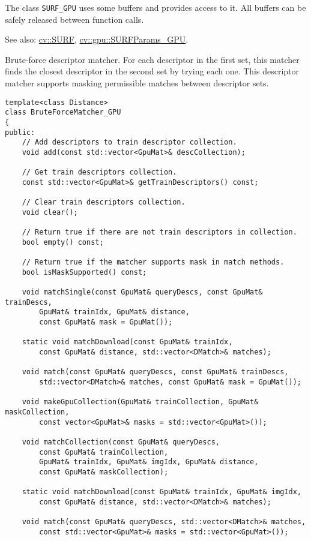 The class \texttt{SURF\_GPU} uses some buffers and provides access to it. All buffers can be safely released between function calls. 

See also: \hyperref[cv.class.SURF]{cv::SURF}, \hyperref[class.gpu.SURFParams]{cv::gpu::SURFParams\_GPU}.


Brute-force descriptor matcher. For each descriptor in the first set, this matcher finds the closest descriptor in the second set by trying each one. This descriptor matcher supports masking permissible matches between descriptor sets.

\begin{lstlisting}
template<class Distance>
class BruteForceMatcher_GPU
{
public:
    // Add descriptors to train descriptor collection.
    void add(const std::vector<GpuMat>& descCollection);

    // Get train descriptors collection.
    const std::vector<GpuMat>& getTrainDescriptors() const;

    // Clear train descriptors collection.
    void clear();

    // Return true if there are not train descriptors in collection.
    bool empty() const;

    // Return true if the matcher supports mask in match methods.
    bool isMaskSupported() const;

    void matchSingle(const GpuMat& queryDescs, const GpuMat& trainDescs,
        GpuMat& trainIdx, GpuMat& distance,
        const GpuMat& mask = GpuMat());

    static void matchDownload(const GpuMat& trainIdx, 
        const GpuMat& distance, std::vector<DMatch>& matches);

    void match(const GpuMat& queryDescs, const GpuMat& trainDescs, 
        std::vector<DMatch>& matches, const GpuMat& mask = GpuMat());

    void makeGpuCollection(GpuMat& trainCollection, GpuMat& maskCollection,
        const vector<GpuMat>& masks = std::vector<GpuMat>());

    void matchCollection(const GpuMat& queryDescs, 
        const GpuMat& trainCollection,
        GpuMat& trainIdx, GpuMat& imgIdx, GpuMat& distance,
        const GpuMat& maskCollection);

    static void matchDownload(const GpuMat& trainIdx, GpuMat& imgIdx, 
        const GpuMat& distance, std::vector<DMatch>& matches);

    void match(const GpuMat& queryDescs, std::vector<DMatch>& matches,
        const std::vector<GpuMat>& masks = std::vector<GpuMat>());


\end{lstlisting}
